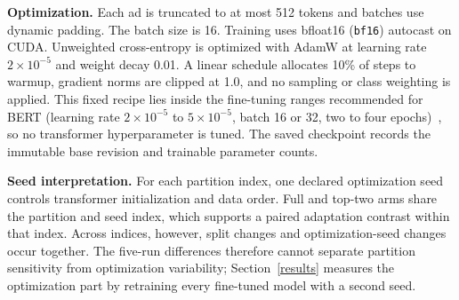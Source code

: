 \textbf{Optimization.} Each ad is truncated to at most 512 tokens and batches use dynamic padding.
The batch size is 16. Training uses bfloat16 (\texttt{bf16}) autocast on
CUDA. Unweighted cross-entropy is optimized with AdamW at learning rate $2\times10^{-5}$ and weight
decay 0.01. A linear schedule allocates 10\% of steps to warmup, gradient norms are clipped at 1.0,
and no sampling or class weighting is applied. This fixed recipe lies inside the fine-tuning
ranges recommended for BERT (learning rate $2\times10^{-5}$ to $5\times10^{-5}$, batch 16 or 32, two
to four epochs)~\cite{devlin2019}, so no transformer hyperparameter is tuned. The saved checkpoint records the immutable base
revision and trainable parameter counts.

\textbf{Seed interpretation.} For each partition index, one declared optimization seed controls
transformer initialization and data order. Full and top-two arms share the partition and seed index,
which supports a paired adaptation contrast within that index. Across indices, however, split
changes and optimization-seed changes occur together. The five-run differences therefore cannot
separate partition sensitivity from optimization variability; Section~\ref{results} measures the
optimization part by retraining every fine-tuned model with a second seed.
